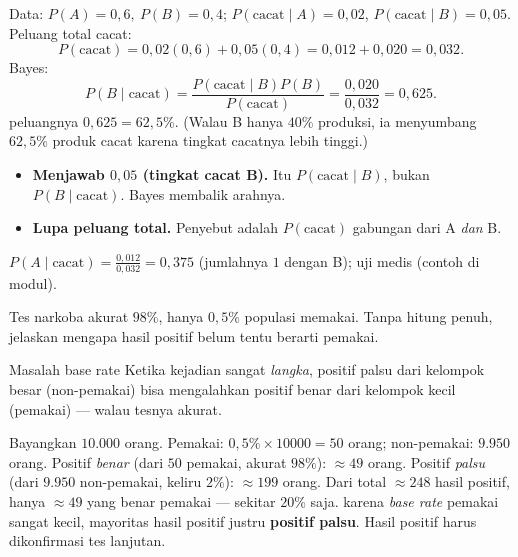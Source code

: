 \jawab
{} Data: $P(A)=0{,}6,\ P(B)=0{,}4$; $P(\text{cacat}\mid A)=0{,}02$,
$P(\text{cacat}\mid B)=0{,}05$.
 Peluang total cacat:
\[
P(\text{cacat})=0{,}02(0{,}6)+0{,}05(0{,}4)=0{,}012+0{,}020=0{,}032.
\]
 Bayes:
\[
P(B\mid\text{cacat})=\frac{P(\text{cacat}\mid B)P(B)}{P(\text{cacat})}
=\frac{0{,}020}{0{,}032}=0{,}625.
\]
\jadi peluangnya $0{,}625=62{,}5\%$. (Walau B hanya $40\%$ produksi, ia
menyumbang $62{,}5\%$ produk cacat karena tingkat cacatnya lebih tinggi.)

\begin{jebakan}
\begin{itemize}[leftmargin=*,topsep=2pt]
  \item \textbf{Menjawab $0{,}05$ (tingkat cacat B).} Itu $P(\text{cacat}\mid B)$,
  bukan $P(B\mid\text{cacat})$. Bayes membalik arahnya.
  \item \textbf{Lupa peluang total.} Penyebut adalah $P(\text{cacat})$ gabungan
  dari A \emph{dan} B.
\end{itemize}
\end{jebakan}

\begin{variasi}
$P(A\mid\text{cacat})=\frac{0{,}012}{0{,}032}=0{,}375$ (jumlahnya $1$ dengan
B); uji medis (contoh di modul).
\end{variasi}

\begin{soalbox}{}
Tes narkoba akurat $98\%$, hanya $0{,}5\%$ populasi memakai. Tanpa hitung penuh,
jelaskan mengapa hasil positif belum tentu berarti pemakai.
\end{soalbox}

\begin{ingat}{Masalah base rate}
Ketika kejadian sangat \emph{langka}, positif palsu dari kelompok besar
(non-pemakai) bisa mengalahkan positif benar dari kelompok kecil (pemakai) ---
walau tesnya akurat.
\end{ingat}

\jawab
{} Bayangkan $10.000$ orang. Pemakai: $0{,}5\%\times10000=50$ orang;
non-pemakai: $9.950$ orang.
 Positif \emph{benar} (dari $50$ pemakai, akurat $98\%$):
$\approx49$ orang.
 Positif \emph{palsu} (dari $9.950$ non-pemakai, keliru $2\%$):
$\approx199$ orang.
 Dari total $\approx248$ hasil positif, hanya $\approx49$ yang benar
pemakai --- sekitar $20\%$ saja.
\jadi karena \emph{base rate} pemakai sangat kecil, mayoritas hasil positif
justru \textbf{positif palsu}. Hasil positif harus dikonfirmasi tes lanjutan.

